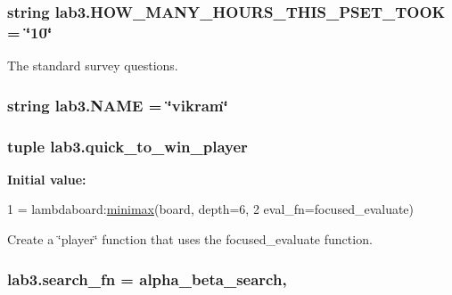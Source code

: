 \subsubsection[{H\+O\+W\+\_\+\+M\+A\+N\+Y\+\_\+\+H\+O\+U\+R\+S\+\_\+\+T\+H\+I\+S\+\_\+\+P\+S\+E\+T\+\_\+\+T\+O\+O\+K}]{\setlength{\rightskip}{0pt plus 5cm}string lab3.\+H\+O\+W\+\_\+\+M\+A\+N\+Y\+\_\+\+H\+O\+U\+R\+S\+\_\+\+T\+H\+I\+S\+\_\+\+P\+S\+E\+T\+\_\+\+T\+O\+O\+K = \char`\"{}10\char`\"{}}\label{namespacelab3_ac15f588150b4ba8f99f8b305c86527cc}


The standard survey questions. 

\hypertarget{namespacelab3_a2d13719e09eaf808047d497d45dff575}{}
\subsubsection[{N\+A\+M\+E}]{\setlength{\rightskip}{0pt plus 5cm}string lab3.\+N\+A\+M\+E = \char`\"{}vikram\char`\"{}}\label{namespacelab3_a2d13719e09eaf808047d497d45dff575}
\hypertarget{namespacelab3_aa43b2937a5bad423a493276473384d9a}{}
\subsubsection[{quick\+\_\+to\+\_\+win\+\_\+player}]{\setlength{\rightskip}{0pt plus 5cm}tuple lab3.\+quick\+\_\+to\+\_\+win\+\_\+player}\label{namespacelab3_aa43b2937a5bad423a493276473384d9a}
{\bfseries Initial value\+:}
\begin{DoxyCode}
1 = lambdaboard:\hyperlink{namespacebasicplayer_a030bbbbdb3c20ccc2984ee862cce6e0f}{minimax}(board, depth=6,
2                                             eval\_fn=focused\_evaluate)
\end{DoxyCode}


Create a \char`\"{}player\char`\"{} function that uses the focused\+\_\+evaluate function. 

\hypertarget{namespacelab3_abc5335867f83db21385d992f00825e22}{}
\subsubsection[{search\+\_\+fn}]{\setlength{\rightskip}{0pt plus 5cm}lab3.\+search\+\_\+fn = {\bf alpha\+\_\+beta\+\_\+search},}\label{namespacelab3_abc5335867f83db21385d992f00825e22}
\hypertarget{namespacelab3_a7c477dab1b106f5495518ad07afa5a16}{}
